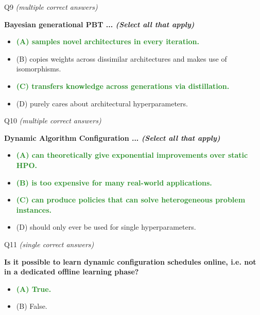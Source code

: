 \documentclass[main]{subfiles}
\newcommand{\correct}[1]{\textcolor{ForestGreen}{\textbf{#1} \checkmark}}
\newcommand{\wrong}[1]{#1}
\begin{document}
\begin{frame}{Q9 \hfill \small\normalfont\textit{(multiple correct answers)}}

\textbf{Bayesian generational PBT ... \textit{(Select all that apply)}}

\begin{itemize}
    \item \correct{(A) \; samples novel architectures in every iteration.}
    \item \wrong{(B) \; copies weights across dissimilar architectures and makes use of isomorphisms.}
    \item \correct{(C) \; transfers knowledge across generations via distillation.}
    \item \wrong{(D) \; purely cares about architectural hyperparameters.}
\end{itemize}

\end{frame}

\begin{frame}{Q10 \hfill \small\normalfont\textit{(multiple correct answers)}}

\textbf{Dynamic Algorithm Configuration ... \textit{(Select all that apply)}}

\begin{itemize}
    \item \correct{(A) \; can theoretically give exponential improvements over static HPO.}
    \item \correct{(B) \; is too expensive for many real-world applications.}
    \item \correct{(C) \; can produce policies that can solve heterogeneous problem instances.}
    \item \wrong{(D) \; should only ever be used for single hyperparameters.}
\end{itemize}

\end{frame}

\begin{frame}{Q11 \hfill \small\normalfont\textit{(single correct answers)}}

\textbf{Is it possible to learn dynamic configuration schedules online, i.e. not in a dedicated offline learning phase?}

\begin{itemize}
    \item \correct{(A) \; True.}
    \item \wrong{(B) \; False.}
\end{itemize}

\end{frame}
\end{document}
